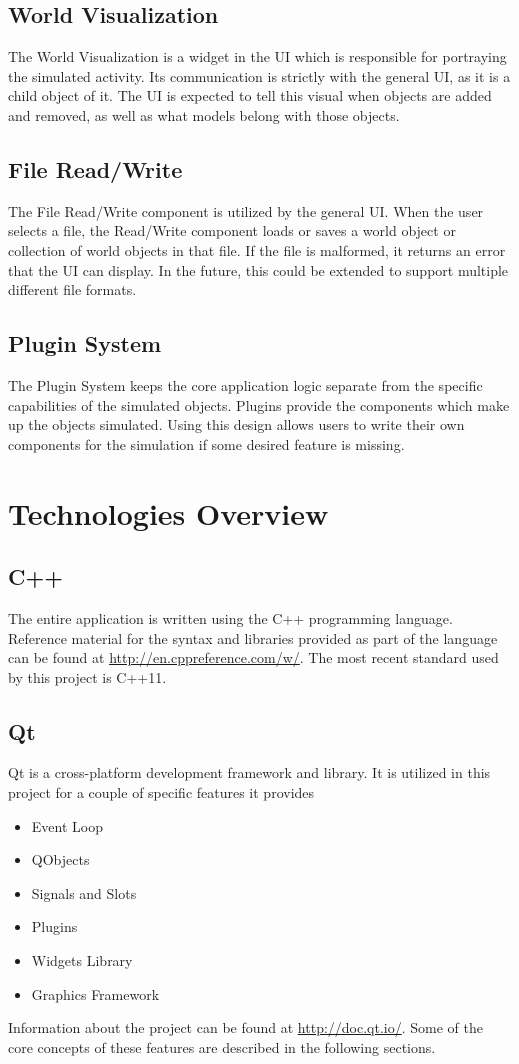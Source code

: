 \subsection{World Visualization}
The World Visualization is a widget in the UI which is responsible for portraying the simulated activity. Its communication is strictly with the general UI, as it is a child object of it. The UI is expected to tell this visual when objects are added and removed, as well as what models belong with those objects.

\subsection{File Read/Write}
The File Read/Write component is utilized by the general UI. When the user selects a file, the Read/Write component loads or saves a world object or collection of world objects in that file. If the file is malformed, it returns an error that the UI can display. In the future, this could be extended to support multiple different file formats.

\subsection{Plugin System}
The Plugin System keeps the core application logic separate from the specific capabilities of the simulated objects. Plugins provide the components which make up the objects simulated. Using this design allows users to write their own components for the simulation if some desired feature is missing.

\section{Technologies Overview}
\subsection{C++}
	The entire application is written using the C++ programming language. Reference material for the syntax and libraries provided as part of the language can be found at \url{http://en.cppreference.com/w/}. The most recent standard used by this project is C++11.
	
\subsection{Qt}
	Qt is a cross-platform development framework and library. It is utilized in this project for a couple of specific features it provides
	\begin{itemize}
		\item Event Loop
		\item QObjects
		\item Signals and Slots
		\item Plugins
		\item Widgets Library
		\item Graphics Framework
	\end{itemize}
	Information about the project can be found at \url{http://doc.qt.io/}. Some of the core concepts of these features are described in the following sections.
	
